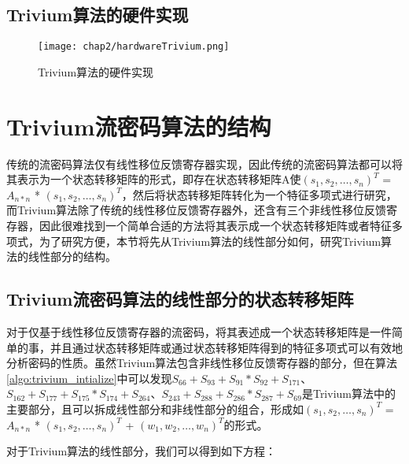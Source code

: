 \subsection{Trivium算法的硬件实现}

\begin{figure}[!htp]
	\centering
	\texttt{[image: chap2/hardwareTrivium.png]}
	\caption{Trivium算法的硬件实现}\label{fig:Trivium算法的硬件实现}
\end{figure}

\section{Trivium流密码算法的结构}

传统的流密码算法仅有线性移位反馈寄存器实现，因此传统的流密码算法都可以将其表示为一个状态转移矩阵的形式，即存在状态转移矩阵A使$(s_{1}, s_{2}, \ldots, s_{n})^{T}$ = $A_{n*n}$ * $(s_{1}, s_{2}, \ldots, s_{n})^{T}$，然后将状态转移矩阵转化为一个特征多项式进行研究，而Trivium算法除了传统的线性移位反馈寄存器外，还含有三个非线性移位反馈寄存器，因此很难找到一个简单合适的方法将其表示成一个状态转移矩阵或者特征多项式，为了研究方便，本节将先从Trivium算法的线性部分如何，研究Trivium算法的线性部分的结构。

\subsection{Trivium流密码算法的线性部分的状态转移矩阵}

对于仅基于线性移位反馈寄存器的流密码，将其表述成一个状态转移矩阵是一件简单的事，并且通过状态转移矩阵或通过状态转移矩阵得到的特征多项式可以有效地分析密码的性质。虽然Trivium算法包含非线性移位反馈寄存器的部分，但在算法\ref{algo:trivium_intialize}中可以发现$S_{66} + S_{93} + S_{91} * S_{92} + S_{171}$、$S_{162} + S_{177} + S_{175} * S_{174} + S_{264}$、$S_{243} + S_{288} + S_{286} * S_{287} + S_{69}$是Trivium算法中的主要部分，且可以拆成线性部分和非线性部分的组合，形成如$(s_{1}, s_{2}, \ldots, s_{n})^{T}$ = $A_{n*n}$ * $(s_{1}, s_{2}, \ldots, s_{n})^{T}$ + $(w_{1}, w_{2}, \ldots, w_{n})^{T}$的形式。

对于Trivium算法的线性部分，我们可以得到如下方程：

